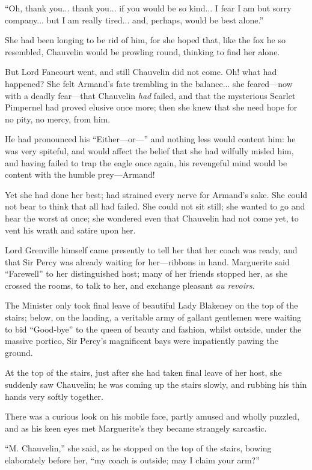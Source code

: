 \documentclass[paper=5.5in:8.5in,BCOR=7mm,twoside,DIV=calc,12pt,usegeometry,chapterprefix,endperiod,headings=big]{scrbook}
\begin{document}
\enquote{Oh, thank you... thank you... if you would be so kind... I fear I am but sorry company... but I am really tired... and, perhaps, would be best alone.}

She had been longing to be rid of him, for she hoped that, like the fox he so resembled, Chauvelin would be prowling round, thinking to find her alone.

But Lord Fancourt went, and still Chauvelin did not come. Oh! what had happened? She felt Armand's fate trembling in the balance... she feared---now with a deadly fear---that Chauvelin \textit{had} failed, and that the mysterious Scarlet Pimpernel had proved elusive once more; then she knew that she need hope for no pity, no mercy, from him.

He had pronounced his \enquote{Either---or---} and nothing less would content him: he was very spiteful, and would affect the belief that she had wilfully misled him, and having failed to trap the eagle once again, his revengeful mind would be content with the humble prey---Armand!

Yet she had done her best; had strained every nerve for Armand's sake. She could not bear to think that all had failed. She could not sit still; she wanted to go and hear the worst at once; she wondered even that Chauvelin had not come yet, to vent his wrath and satire upon her.

Lord Grenville himself came presently to tell her that her coach was ready, and that Sir Percy was already waiting for her---ribbons in hand. Marguerite said \enquote{Farewell} to her distinguished host; many of her friends stopped her, as she crossed the rooms, to talk to her, and exchange pleasant \textit{au revoirs}.

The Minister only took final leave of beautiful Lady Blakeney on the top of the stairs; below, on the landing, a veritable army of gallant gentlemen were waiting to bid \enquote{Good-bye} to the queen of beauty and fashion, whilst outside, under the massive portico, Sir Percy's magnificent bays were impatiently pawing the ground.

At the top of the stairs, just after she had taken final leave of her host, she suddenly saw Chauvelin; he was coming up the stairs slowly, and rubbing his thin hands very softly together.

There was a curious look on his mobile face, partly amused and wholly puzzled, and as his keen eyes met Marguerite's they became strangely sarcastic.

\enquote{M. Chauvelin,} she said, as he stopped on the top of the stairs, bowing elaborately before her, \enquote{my coach is outside; may I claim your arm?}
\end{document}
